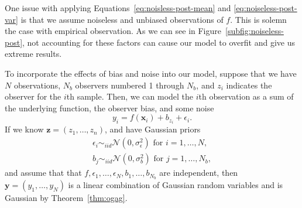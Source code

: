 One issue with applying Equations~\ref{eq:noisless-post-mean} and \ref{eq:noiseless-post-var} is that we assume noiseless and unbiased observations of $f$.
This is solemn the case with empirical observation.
As we can see in Figure~\ref{subfig:noiseless-post}, not accounting for these factors can cause our model to overfit and give us extreme results.

To incorporate the effects of bias and noise into our model, suppose that we have $N$ observations, $N_b$ observers numbered 1 through $N_b$, and $z_i$ indicates the observer for the $i$th sample.
Then, we can model the $i$th observation as a sum of the underlying function, the observer bias, and some noise
\begin{equation*}
    y_i = f(\mathbf{x}_i) + b_{z_i} + \epsilon_i.
\end{equation*}
If we know $\mathbf{z} = (z_1, \dots, z_n)$, and have Gaussian priors
\begin{align*}
    \epsilon_i \sim_{iid} \mathcal{N}(0, \sigma^2_{\epsilon}) \text{ for $i = 1, \dots, N$}, \\
    b_j \sim_{iid} \mathcal{N}(0, \sigma_{b}^2) \text{ for $j = 1, \dots, N_b$},
\end{align*}
and assume that that $f, \epsilon_1, \dots, \epsilon_N, b_1, \dots, b_{N_b}$ are independent,
then $\mathbf{y} = (y_1, \dots, y_N)$ is a linear combination of Gaussian random variables
and is Gaussian by Theorem~\ref{thm:ogag}.

